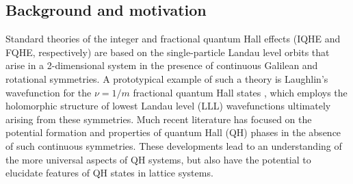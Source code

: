 \documentclass[aps,twocolumn,letterpaper,twoside,nobalancelastpage,groupedaddress,amsmath,amssymb,floatfix,citeautoscript]{revtex4-1}
\begin{document}
\subsection{Background and motivation}



Standard theories of the integer and fractional quantum Hall effects (IQHE and FQHE, respectively) are based on the single-particle Landau level orbits that arise in a 2-dimensional system in the presence of continuous Galilean and rotational symmetries. A prototypical example of such a theory is Laughlin's wavefunction for the $\nu = 1/m$ fractional quantum Hall states \cite{Laughlin:1983hk}, which employs the holomorphic structure of lowest Landau level (LLL) wavefunctions ultimately arising from these symmetries. Much recent literature has focused on the potential formation and properties of quantum Hall (QH) phases in the absence of such continuous symmetries. These developments lead to an understanding of the more universal aspects of QH systems, but also have the potential to elucidate features of QH states in lattice systems. 

\end{document}
